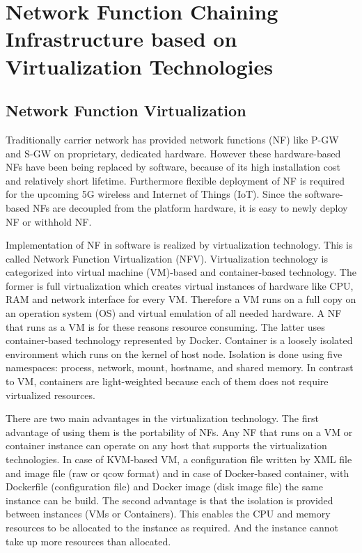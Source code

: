 \section{Network Function Chaining Infrastructure based on Virtualization Technologies} 
\subsection{Network Function Virtualization}
Traditionally carrier network has provided network functions (NF) like P-GW and S-GW on proprietary, dedicated hardware. However these hardware-based NFs have been being replaced by software, because of its high installation cost and relatively short lifetime. Furthermore flexible deployment of NF is required for the upcoming 5G wireless and Internet of Things (IoT). Since the software-based NFs are decoupled from the platform hardware, it is easy to newly deploy NF or withhold NF. 

Implementation of NF in software is realized by virtualization technology. This is called Network Function Virtualization (NFV). Virtualization technology is categorized into virtual machine (VM)-based and container-based technology. The former is full virtualization which creates virtual instances of hardware like CPU, RAM and network interface for every VM. Therefore a VM runs on a full copy on an operation system (OS) and virtual emulation of all needed hardware. A NF that runs as a VM is for these reasons resource consuming. The latter uses container-based technology represented by Docker\cite{Docker}. Container is a loosely isolated environment which runs on the kernel of host node. Isolation is done using five namespaces: process, network, mount, hostname, and shared memory. In contrast to VM, containers are light-weighted because each of them does not require virtualized resources.  

There are two main advantages in the virtualization technology. The first advantage of using them is the portability of NFs. Any NF that runs on a VM or container instance can operate on any host that supports the virtualization technologies. In case of KVM-based\cite{KVM} VM, a configuration file written by XML file and image file (raw or qcow format) and in case of Docker-based container, with Dockerfile (configuration file) and Docker image (disk image file) the same instance can be build. The second advantage is that the isolation is provided between instances (VMs or Containers). This enables the CPU and memory resources to be allocated to the instance as required. And the instance cannot take up more resources than allocated. 


